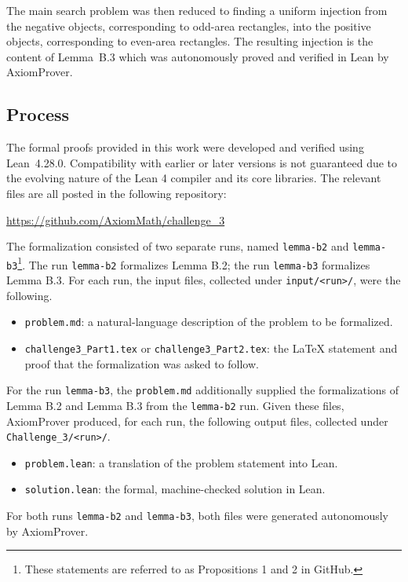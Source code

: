 \documentclass[11pt,reqno]{amsart}
\theoremstyle{plain}
\theoremstyle{remark}
\theoremstyle{definition}
\numberwithin{equation}{section}
\begin{document}
The main search problem was then reduced to finding a uniform injection from the negative
objects, corresponding to odd-area rectangles, into the positive objects, corresponding to even-area
rectangles.  The resulting injection is the content of Lemma~B.3 which was autonomously proved and verified in Lean by AxiomProver.




\subsection*{Process}
The formal proofs provided in this work were developed and verified using Lean~4.28.0.
Compatibility with earlier or later versions is not guaranteed due to the
evolving nature of the Lean 4 compiler and its core libraries.
The relevant files are all posted in the following repository:
\begin{center}
  \url{https://github.com/AxiomMath/challenge_3}
\end{center}
The formalization consisted of two separate runs, named
\texttt{lemma-b2} and \texttt{lemma-b3}\footnote{These statements are referred to as Propositions 1 and 2 in GitHub.}.  The run \texttt{lemma-b2} formalizes
Lemma B.2; the run \texttt{lemma-b3} formalizes Lemma B.3.
For each run, the input files, collected under \texttt{input/<run>/}, were the following.
\begin{itemize}
\item \texttt{problem.md}: a natural-language description of the problem to be formalized.
\item \texttt{challenge3\_Part1.tex} or \texttt{challenge3\_Part2.tex}: the \LaTeX{} statement and proof that the formalization was asked to follow.
\end{itemize}
For the run \texttt{lemma-b3}, the \texttt{problem.md} additionally supplied the
formalizations of Lemma B.2 and Lemma B.3 from the \texttt{lemma-b2} run.
Given these files,
AxiomProver produced, for each run, the following output files, collected under \texttt{Challenge\_3/<run>/}.
\begin{itemize}
 \item \texttt{problem.lean}: a translation of the problem statement into Lean.
 \item \texttt{solution.lean}: the formal, machine-checked solution in Lean.
\end{itemize}
For both runs \texttt{lemma-b2} and \texttt{lemma-b3},
both files were generated autonomously by AxiomProver.
\end{document}
